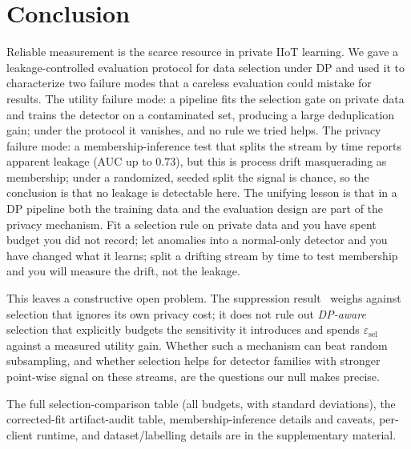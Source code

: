 \documentclass[pdflatex,sn-mathphys-num]{sn-jnl}
\theoremstyle{thmstyleone}
\theoremstyle{thmstyletwo}
\theoremstyle{thmstylethree}
\begin{document}
\section{Conclusion}\label{sec:conclusion}
Reliable measurement is the scarce resource in private IIoT learning. We gave a
leakage-controlled evaluation protocol for data selection under DP and used it to characterize two failure modes that a careless evaluation could mistake for results. The utility failure mode: a pipeline fits the selection gate on private data and trains the detector on a contaminated set, producing a large deduplication gain; under the protocol it
vanishes, and no rule we tried helps. The privacy failure mode: a membership-inference test that splits the stream by time reports apparent leakage (AUC up to $0.73$), but this
is process drift masquerading as membership; under a randomized, seeded split the
signal is chance, so the conclusion is that no leakage is detectable here. The unifying lesson is that in a DP pipeline both the training data and the evaluation
design are part of the privacy mechanism. Fit a selection rule on private data and you have spent
budget you did not record; let anomalies into a normal-only detector and you have
changed what it learns; split a drifting stream by time to test membership and you
will measure the drift, not the leakage.

This leaves a constructive open problem. The suppression
result~\cite{stoddard2026suppress} weighs against selection that ignores its own
privacy cost; it does not rule out \emph{DP-aware} selection that explicitly
budgets the sensitivity it introduces and spends $\varepsilon_{\text{sel}}$ against a
measured utility gain. Whether such a mechanism can beat random subsampling, and
whether selection helps for detector families with stronger point-wise signal on
these streams, are the questions our null makes precise.

\backmatter
{} The full selection-comparison table (all budgets,
with standard deviations), the corrected-fit artifact-audit table, membership-inference
details and caveats, per-client runtime, and dataset/labelling details are in the
supplementary material.
\end{document}
